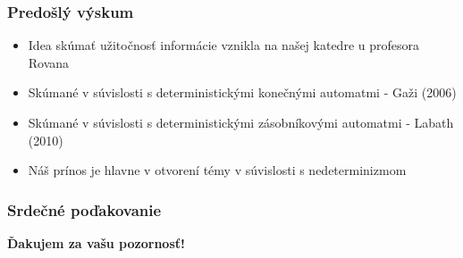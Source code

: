 \documentclass[notheorems]{beamer}
\begin{document}
\begin{frame}
\frametitle{Predošlý výskum}

\begin{itemize}
\item Idea skúmať užitočnosť informácie vznikla na našej katedre u profesora Rovana
\item Skúmané v súvislosti s deterministickými konečnými automatmi - Gaži (2006)
\item Skúmané v súvislosti s deterministickými zásobníkovými automatmi - Labath (2010)
\item Náš prínos je hlavne v otvorení témy v súvislosti s nedeterminizmom
\end{itemize}
\end{frame}

\begin{frame}
\frametitle{Srdečné poďakovanie}

\begin{center}
\Huge
\textbf{Ďakujem za vašu pozornosť!}
\end{center}

\end{frame}
\end{document}
